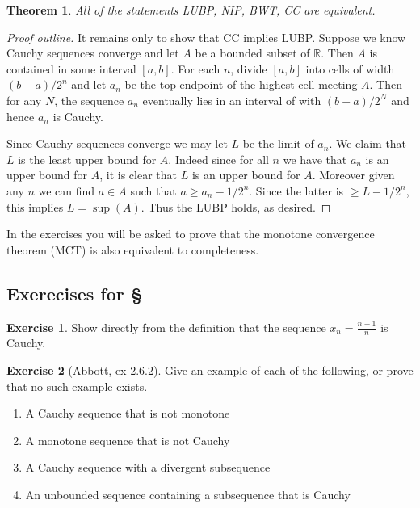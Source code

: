 \documentclass[11pt,oneside]{amsbook}
\newcommand{\R}{\mathbb R}
\theoremstyle{definition}
\newtheorem{exerc}{Exercise}[section]
\theoremstyle{plain}
\newtheorem{thm}{Theorem}[section]
\theoremstyle{definition}
\theoremstyle{remark}
\numberwithin{equation}{section}
\numberwithin{figure}{section}
\begin{document}
\begin{thm}
  All of the statements LUBP, NIP, BWT, CC are equivalent.
\end{thm}

\begin{proof}[Proof outline]
  It remains only to show that CC implies LUBP. Suppose we know Cauchy sequences converge and let $A$ be a bounded subset of $\R$. Then $A$ is contained in some interval $[a,b]$. For each $n$, divide $[a,b]$ into cells of width $(b-a)/2^n$ and let $a_n$ be the top endpoint of the highest cell meeting $A$. Then for any $N$, the sequence $a_n$ eventually lies in an interval of with $(b-a)/2^N$ and hence $a_n$ is Cauchy.

  Since Cauchy sequences converge we may let $L$ be the limit of $a_n$. We claim that $L$ is the least upper bound for $A$. Indeed since for all $n$ we have that $a_n$ is an upper bound for $A$, it is clear that $L$ is an upper bound for $A$. Moreover given any $n$ we can find $a\in A$ such that $a\geq a_n-1/2^n$. Since the latter is $\geq L-1/2^n$, this implies $L=\sup(A)$. Thus the LUBP holds, as desired.
\end{proof}

In the exercises you will be asked to prove that the monotone convergence theorem (MCT) is also equivalent to completeness.

\newpage
\subsection*{Exerecises for \S \thesection}

\begin{exerc}
  Show directly from the definition that the sequence $x_n=\frac{n+1}{n}$ is Cauchy.
\end{exerc}

\begin{exerc}[Abbott, ex 2.6.2]
  Give an example of each of the following, or prove that no such example exists.
  \begin{enumerate}
    \item A Cauchy sequence that is not monotone
    \item A monotone sequence that is not Cauchy
    \item A Cauchy sequence with a divergent subsequence
    \item An unbounded sequence containing a subsequence that is Cauchy
  \end{enumerate}
\end{exerc}
\end{document}
